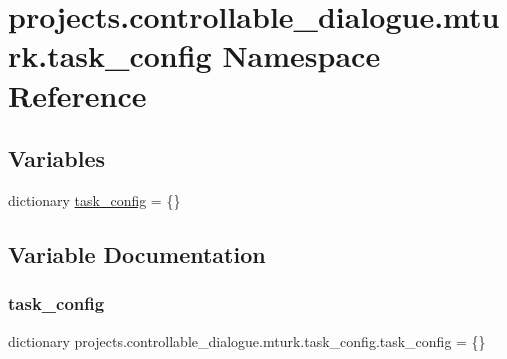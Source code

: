 \hypertarget{namespaceprojects_1_1controllable__dialogue_1_1mturk_1_1task__config}{}\section{projects.\+controllable\+\_\+dialogue.\+mturk.\+task\+\_\+config Namespace Reference}
\label{namespaceprojects_1_1controllable__dialogue_1_1mturk_1_1task__config}
\subsection*{Variables}
\begin{DoxyCompactItemize}
\item 
dictionary \hyperlink{namespaceprojects_1_1controllable__dialogue_1_1mturk_1_1task__config_a90b45a5b28199f14a88e364453a6616b}{task\+\_\+config} = \{\}
\end{DoxyCompactItemize}


\subsection{Variable Documentation}
\mbox{\label{namespaceprojects_1_1controllable__dialogue_1_1mturk_1_1task__config_a90b45a5b28199f14a88e364453a6616b}} 
\subsubsection{\texorpdfstring{task\+\_\+config}{task\_config}}
{\footnotesize\ttfamily dictionary projects.\+controllable\+\_\+dialogue.\+mturk.\+task\+\_\+config.\+task\+\_\+config = \{\}}

